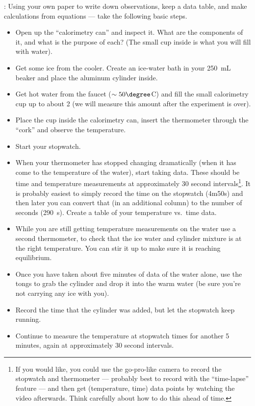 : Using your own paper to write down observations, keep a data table, and make calculations from equations --- take the following basic steps.
	\begin{itemize}
	\item Open up the ``calorimetry can'' and inspect it.  What are the components of it, and what is the purpose of each?  (The small cup inside is what you will fill with water).
	\item Get some ice from the cooler. Create an ice-water bath in your 250~mL beaker and place the aluminum cylinder inside.
	\item Get hot water from the faucet ($\sim50\degree$C) and fill the small calorimetry cup up to about \unit{2}{\centi\meter} (we will measure this amount after the experiment is over).
	\item Place the cup inside the calorimetry can, insert the thermometer through the ``cork'' and observe the temperature.  
	\item Start your stopwatch.
	\item When your thermometer has stopped changing dramatically (when it has come to the temperature of the water), start taking data.  These should be time and temperature measurements at approximately 30 second intervals\footnote{If you would like, you could use the go-pro-like camera to record the stopwatch and thermometer --- probably best to record with the ``time-lapse'' feature --- and then get (temperature, time) data points by watching the video afterwards.  Think carefully about how to do this ahead of time.}. It is probably easiest to simply record the time on the stopwatch (4m50s) and then later you can convert  that (in an additional column) to the number of seconds (290~s). Create a table of your temperature vs.\ time data.  
	\item While you are still getting temperature measurements on the water use a second thermometer, to check that the ice water and cylinder mixture is at the right temperature.  You can stir it up to make sure it is reaching equilibrium.
	\item Once you have taken about five minutes of data of the water alone, use the tongs to grab the cylinder and drop it into the warm water (be sure you're not carrying any ice with you).
	\item Record the time that the cylinder was added, but let the stopwatch keep running.
	\item Continue to measure the temperature at stopwatch times for another 5 minutes, again at  approximately 30 second intervals.

\end{itemize}
